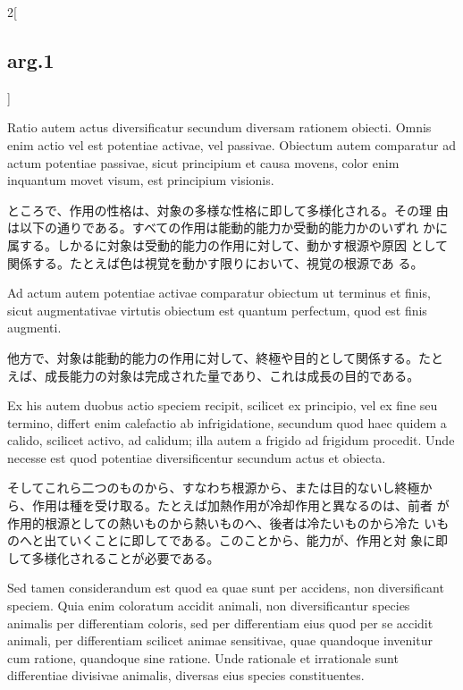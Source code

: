 \documentclass[paper=a4paper,fontsize=10pt,jafontsize=9pt,titlepage]{jlreq}
\begin{document}
\begin{paracol}{2}[\subsection{arg.1}]
\switchcolumn*


 Ratio autem actus diversificatur secundum diversam rationem
 obiecti. Omnis enim actio vel est potentiae activae, vel
 passivae. Obiectum autem comparatur ad actum potentiae passivae,
 sicut principium et causa movens, color enim inquantum movet visum,
 est principium visionis.
 
\switchcolumn

 ところで、作用の性格は、対象の多様な性格に即して多様化される。その理
 由は以下の通りである。すべての作用は能動的能力か受動的能力かのいずれ
 かに属する。しかるに対象は受動的能力の作用に対して、動かす根源や原因
 として関係する。たとえば色は視覚を動かす限りにおいて、視覚の根源であ
 る。

\switchcolumn*

 Ad actum autem potentiae activae comparatur obiectum ut terminus et
 finis, sicut augmentativae virtutis obiectum est quantum perfectum,
 quod est finis augmenti. 
 
 
\switchcolumn

他方で、対象は能動的能力の作用に対して、終極や目的として関係する。たと
えば、成長能力の対象は完成された量であり、これは成長の目的である。

\switchcolumn*

Ex his autem duobus actio speciem recipit, scilicet ex principio, vel
 ex fine seu termino, differt enim calefactio ab infrigidatione,
 secundum quod haec quidem a calido, scilicet activo, ad calidum; illa
 autem a frigido ad frigidum procedit. Unde necesse est quod potentiae
 diversificentur secundum actus et obiecta.

 \switchcolumn

 そしてこれら二つのものから、すなわち根源から、または目的ないし終極か
 ら、作用は種を受け取る。たとえば加熱作用が冷却作用と異なるのは、前者
 が作用的根源としての熱いものから熱いものへ、後者は冷たいものから冷た
 いものへと出ていくことに即してである。このことから、能力が、作用と対
 象に即して多様化されることが必要である。

 \switchcolumn*

  Sed tamen considerandum est quod ea quae sunt per accidens, non
 diversificant speciem. Quia enim coloratum accidit animali, non
 diversificantur species animalis per differentiam coloris, sed per
 differentiam eius quod per se accidit animali, per differentiam
 scilicet animae sensitivae, quae quandoque invenitur cum ratione,
 quandoque sine ratione. Unde rationale et irrationale sunt
 differentiae divisivae animalis, diversas eius species constituentes.
 

\end{paracol}
\end{document}
